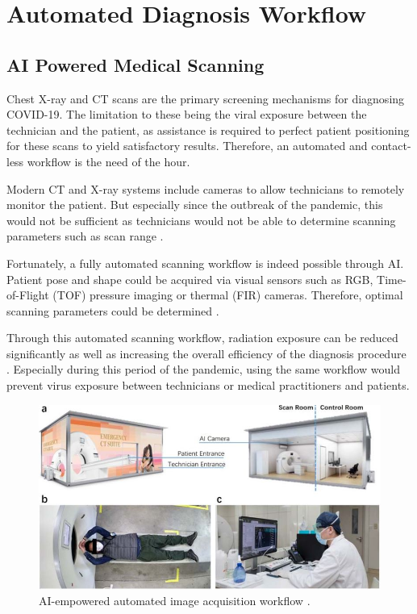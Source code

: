 
\chapter{Automated Diagnosis Workflow} \label{Automated Diagnosis Workflow} %


\section*{AI Powered Medical Scanning}

Chest X-ray and CT scans are the primary screening mechanisms for
diagnosing COVID-19. The limitation to these being the viral 
exposure between the technician and the patient, as assistance 
is required to perfect patient positioning for these scans to 
yield satisfactory results. Therefore, an automated and 
contact-less workflow is the need of the hour.

Modern CT and X-ray systems include cameras to allow 
technicians to remotely monitor the patient. But especially 
since the outbreak of the pandemic, this would not be 
sufficient as technicians would not be able to determine 
scanning parameters such as scan range \cite{SFJ+2020}.

Fortunately, a fully automated scanning workflow is indeed possible 
through AI. Patient pose and shape could be acquired via 
visual sensors such as RGB, Time-of-Flight (TOF) pressure imaging or 
thermal (FIR) cameras. Therefore, optimal scanning parameters could be 
determined \cite{UIH2020, SVK+2017, SVY+2017, SIE2020, LJU+2020, MAR2020, AFA+2020, SIE(2)2020}.

Through this automated scanning workflow, radiation exposure 
can be reduced significantly as well as increasing the overall efficiency of the 
diagnosis procedure \cite{WYX+2020}. Especially during this period of the pandemic, using 
the same workflow would prevent virus exposure between technicians or 
medical practitioners and patients.
\\
\begin{figure}[H]
    \centering
    \includegraphics{Images/AutomatedCTScan.JPG}
    \caption[Mobile CT Platform]{AI-empowered automated image acquisition workflow \cite{SFJ+2020}.}
    \label{fig:Mobile CT Platform}
    \end{figure}

